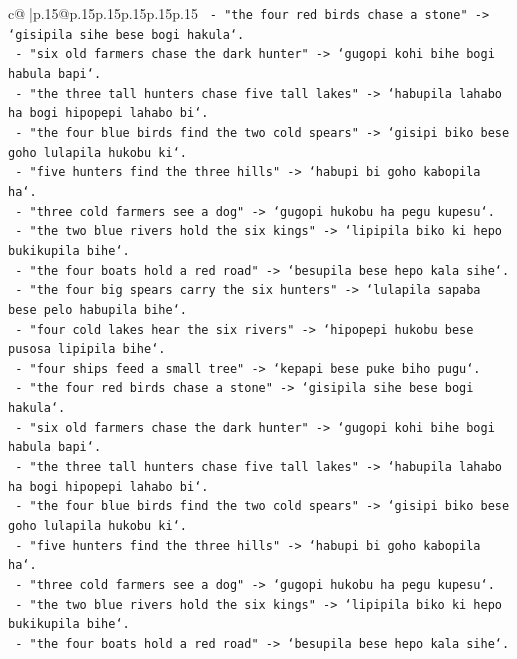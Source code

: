 \documentclass{article}
\begin{document}
{\begin{supertabular}{c@{$\;$}|p{.15\linewidth}@{}p{.15\linewidth}p{.15\linewidth}p{.15\linewidth}p{.15\linewidth}p{.15\linewidth}}
{{{\texttt{  {-} "the four red birds chase a stone" {-}> `gisipila sihe bese bogi hakula`.} \\
\texttt{  {-} "six old farmers chase the dark hunter" {-}> `gugopi kohi bihe bogi habula bapi`.} \\
\texttt{  {-} "the three tall hunters chase five tall lakes" {-}> `habupila lahabo ha bogi hipopepi lahabo bi`.} \\
\texttt{  {-} "the four blue birds find the two cold spears" {-}> `gisipi biko bese goho lulapila hukobu ki`.} \\
\texttt{  {-} "five hunters find the three hills" {-}> `habupi bi goho kabopila ha`.} \\
\texttt{  {-} "three cold farmers see a dog" {-}> `gugopi hukobu ha pegu kupesu`.} \\
\texttt{  {-} "the two blue rivers hold the six kings" {-}> `lipipila biko ki hepo bukikupila bihe`.} \\
\texttt{  {-} "the four boats hold a red road" {-}> `besupila bese hepo kala sihe`.} \\
\texttt{  {-} "the four big spears carry the six hunters" {-}> `lulapila sapaba bese pelo habupila bihe`.} \\
\texttt{  {-} "four cold lakes hear the six rivers" {-}> `hipopepi hukobu bese pusosa lipipila bihe`.} \\
\texttt{  {-} "four ships feed a small tree" {-}> `kepapi bese puke biho pugu`.} \\
\texttt{  {-} "the four red birds chase a stone" {-}> `gisipila sihe bese bogi hakula`.} \\
\texttt{  {-} "six old farmers chase the dark hunter" {-}> `gugopi kohi bihe bogi habula bapi`.} \\
\texttt{  {-} "the three tall hunters chase five tall lakes" {-}> `habupila lahabo ha bogi hipopepi lahabo bi`.} \\
\texttt{  {-} "the four blue birds find the two cold spears" {-}> `gisipi biko bese goho lulapila hukobu ki`.} \\
\texttt{  {-} "five hunters find the three hills" {-}> `habupi bi goho kabopila ha`.} \\
\texttt{  {-} "three cold farmers see a dog" {-}> `gugopi hukobu ha pegu kupesu`.} \\
\texttt{  {-} "the two blue rivers hold the six kings" {-}> `lipipila biko ki hepo bukikupila bihe`.} \\
\texttt{  {-} "the four boats hold a red road" {-}> `besupila bese hepo kala sihe`.} \\
}}}
\end{supertabular}}
\end{document}
